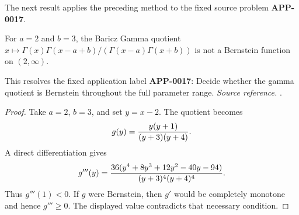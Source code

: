 The next result applies the preceding method to the fixed source problem \textbf{APP-0017}.
\begin{counterexample}
\label{res:baricz-gamma-quotient-a2b3-not-bf}
For \(a=2\) and \(b=3\), the Baricz Gamma quotient \(x\mapsto\Gamma(x)\Gamma(x-a+b)/(\Gamma(x-a)\Gamma(x+b))\) is not a Bernstein function on \((2,\infty)\).

This resolves the fixed application label \textbf{APP-0017}: Decide whether the gamma quotient is Bernstein throughout the full parameter range.
\emph{Source reference.} \cite{app-app-0017-source}.
\end{counterexample}
\begin{proof}
Take \(a=2\), \(b=3\), and set \(y=x-2\).  The quotient becomes
\[
  g(y)={y(y+1)\over (y+3)(y+4)} .
\]
A direct differentiation gives
\[
  g'''(y)=
 {36(y^4+8y^3+12y^2-40y-94)\over (y+3)^4(y+4)^4}.
\]
Thus \(g'''(1)<0\).  If \(g\) were Bernstein, then \(g'\) would be completely
monotone and hence \(g'''\ge0\).  The displayed value contradicts that
necessary condition.
\end{proof}

